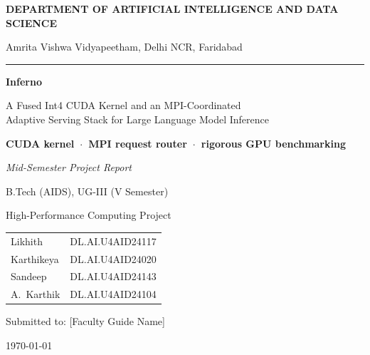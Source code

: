 \documentclass[11pt,a4paper]{article}
\begin{document}
\begin{titlepage}
\centering
{\large\bfseries DEPARTMENT OF ARTIFICIAL INTELLIGENCE AND DATA SCIENCE\par}
\vspace{0.2cm}
{\large Amrita Vishwa Vidyapeetham, Delhi NCR, Faridabad\par}
\vspace{0.5cm}
\rule{0.55\linewidth}{0.8pt}\par
\vspace{1.8cm}

{\Huge\bfseries Inferno\par}
\vspace{0.35cm}
{\Large A Fused Int4 CUDA Kernel and an MPI-Coordinated\\
Adaptive Serving Stack for Large Language Model Inference\par}
\vspace{0.6cm}
{\large\bfseries CUDA kernel~$\cdot$~MPI request router~$\cdot$~rigorous GPU benchmarking\par}
\vspace{0.8cm}
{\large\itshape Mid-Semester Project Report\par}
\vspace{2.0cm}

{\large B.Tech (AIDS), UG-III (V Semester)\par}
{\large High-Performance Computing Project\par}
\vspace{1.3cm}

{\large
\begin{tabular}{ll}
Likhith & DL.AI.U4AID24117 \\[2pt]
Karthikeya & DL.AI.U4AID24020 \\[2pt]
Sandeep & DL.AI.U4AID24143 \\[2pt]
A.\ Karthik & DL.AI.U4AID24104 \\
\end{tabular}
\par}

\vfill
{\large Submitted to: [Faculty Guide Name]\par}
\vspace{0.4cm}
{\large \today\par}
\end{titlepage}

\end{document}
